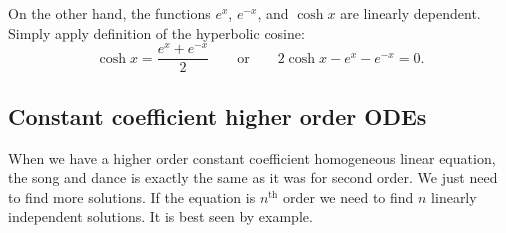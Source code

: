 \documentclass[12pt]{book}
\begin{document}
\begin{example}
On the other hand, the functions $e^x$, $e^{-x}$, and $\cosh x$ are linearly
dependent.  Simply apply definition of the hyperbolic cosine:
\begin{equation*}
\cosh x = \frac{e^x + e^{-x}}{2} 
\qquad
\text{or}
\qquad
2 \cosh x - e^x - e^{-x} = 0.
\end{equation*}
\end{example}

\subsection{Constant coefficient higher order ODEs}

When we have a higher order constant coefficient homogeneous linear
equation, the song and dance is exactly the same as it was for second order.
We just need to find more solutions.  If the equation is
$n^{\text{th}}$ order we need to find $n$ linearly independent solutions.
It is best seen by example.
\end{document}
